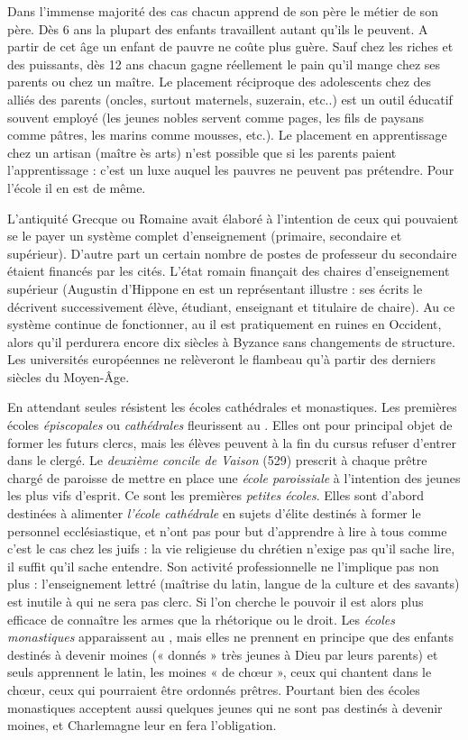  Dans l'immense majorité des cas chacun apprend de son père le métier de son père. Dès 6 ans la plupart des enfants travaillent autant qu'ils le peuvent. A partir de cet âge un enfant de pauvre ne coûte plus guère. Sauf chez les riches et des puissants, dès 12 ans chacun gagne réellement le pain qu'il mange chez ses parents ou chez un maître. Le placement réciproque des adolescents chez des alliés des parents (oncles, surtout maternels, suzerain, etc..) est un outil éducatif souvent employé (les jeunes nobles servent comme pages, les fils de paysans comme pâtres, les marins comme mousses, etc.). Le placement en apprentissage chez un artisan (maître ès arts) n'est possible que si les parents paient l'apprentissage : c'est un luxe auquel les pauvres ne peuvent pas prétendre. Pour l'école il en est de même. 

 L'antiquité Grecque ou Romaine avait élaboré à l'intention de ceux qui pouvaient se le payer un système complet d'enseignement (primaire, secondaire et supérieur). D'autre part un certain nombre de postes de professeur du secondaire étaient financés par les cités. L'état romain finançait des chaires d'enseignement supérieur (Augustin d'Hippone en est un représentant illustre : ses écrits le décrivent successivement élève, étudiant, enseignant et titulaire de chaire). Au  ce système continue de fonctionner, au  il est pratiquement en ruines en Occident, alors qu'il perdurera encore dix siècles à Byzance sans changements de structure. Les universités européennes ne relèveront le flambeau qu'à partir des derniers siècles du Moyen-Âge. 

 En attendant seules résistent les écoles cathédrales et monastiques. Les premières écoles \emph{épiscopales} ou \emph{cathédrales} fleurissent au . Elles ont pour principal objet de former les futurs clercs, mais les élèves peuvent à la fin du cursus refuser d'entrer dans le clergé. Le \emph{deuxième concile de Vaison} (529) prescrit à chaque prêtre chargé de paroisse de mettre en place une \emph{école paroissiale} à l'intention des jeunes les plus vifs d'esprit. Ce sont les premières \emph{petites écoles}. Elles sont d'abord destinées à alimenter \emph{l'école cathédrale} en sujets d'élite destinés à former le personnel ecclésiastique, et n'ont pas pour but d'apprendre à lire à tous comme c'est le cas chez les juifs : la vie religieuse du chrétien n'exige pas qu'il sache lire, il suffit qu'il sache entendre. Son activité professionnelle ne l'implique pas non plus : l'enseignement lettré (maîtrise du latin, langue de la culture et des savants) est inutile à qui ne sera pas clerc. Si l'on cherche le pouvoir il est alors plus efficace de connaître les armes que la rhétorique ou le droit. Les \emph{écoles monastiques} apparaissent au , mais elles ne prennent en principe que des enfants destinés à devenir moines (« donnés » très jeunes à Dieu par leurs parents) et seuls apprennent le latin, les moines « de chœur », ceux qui chantent dans le chœur, ceux qui pourraient être ordonnés prêtres. Pourtant bien des écoles monastiques acceptent aussi quelques jeunes qui ne sont pas destinés à devenir moines, et Charlemagne leur en fera l'obligation.
 
 
 